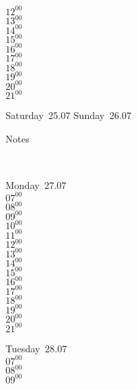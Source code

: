 \documentclass[11pt,a4paper]{book}\usepackage[]{graphicx}\usepackage[]{color}
\begin{document}
{{{\begin{tcolorbox}
{$12^{00}$\\
$13^{00}$\\
$14^{00}$\\
$15^{00}$\\
$16^{00}$\\
$17^{00}$\\
$18^{00}$\\
$19^{00}$\\
$20^{00}$\\
$21^{00}$}\\
\end{tcolorbox} 
%
\begin{tcolorbox}[height=(\textheight-10mm)/6]
Saturday~25.07
\tcblower
Sunday~26.07
\end{tcolorbox} %
%
\begin{tcolorbox}[height=(\textheight-10mm)/6,sidebyside=false]
Notes
\end{tcolorbox}
\clearpage
\vspace{2 mm}\\
%
%
\begin{tcolorbox}
Monday~27.07\\
{ 
$07^{00}$\\
$08^{00}$\\
$09^{00}$\\
$10^{00}$\\
$11^{00}$\\
$12^{00}$\\
$13^{00}$\\
$14^{00}$\\
$15^{00}$\\
$16^{00}$\\
$17^{00}$\\
$18^{00}$\\
$19^{00}$\\
$20^{00}$\\
$21^{00}$}\\
\end{tcolorbox}
%
\begin{tcolorbox}
Tuesday~28.07\\
{ 
$07^{00}$\\
$08^{00}$\\
$09^{00}$\\
}
\end{tcolorbox}}}}
\end{document}

